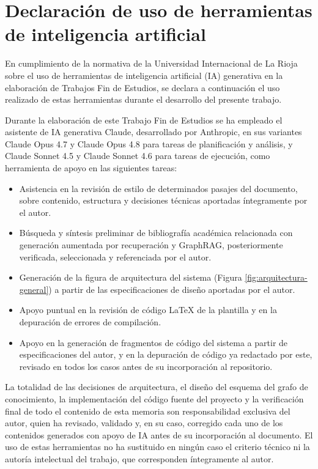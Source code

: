 \documentclass[11pt,a4paper,spanish]{book}
\numberwithin{equation}{chapter}
\numberwithin{figure}{chapter}
\numberwithin{table}{chapter}
\begin{document}
\chapter{Declaración de uso de herramientas de inteligencia artificial}

En cumplimiento de la normativa de la Universidad Internacional de La Rioja sobre el uso de herramientas de inteligencia artificial (IA) generativa en la elaboración de Trabajos Fin de Estudios, se declara a continuación el uso realizado de estas herramientas durante el desarrollo del presente trabajo.

Durante la elaboración de este Trabajo Fin de Estudios se ha empleado el asistente de IA generativa Claude, desarrollado por Anthropic, en sus variantes Claude Opus 4.7 y Claude Opus 4.8 \cite{anthropic2026opus47, anthropic2026opus48} para tareas de planificación y análisis, y Claude Sonnet 4.5 y Claude Sonnet 4.6 \cite{anthropic2026sonnet45, anthropic2026sonnet46} para tareas de ejecución, como herramienta de apoyo en las siguientes tareas:

\begin{itemize}
	\item Asistencia en la revisión de estilo de determinados pasajes del documento, sobre contenido, estructura y decisiones técnicas aportadas íntegramente por el autor.
	\item Búsqueda y síntesis preliminar de bibliografía académica relacionada con generación aumentada por recuperación y GraphRAG, posteriormente verificada, seleccionada y referenciada por el autor.
	\item Generación de la figura de arquitectura del sistema (Figura \ref{fig:arquitectura-general}) a partir de las especificaciones de diseño aportadas por el autor.
	\item Apoyo puntual en la revisión de código LaTeX de la plantilla y en la depuración de errores de compilación.
    \item Apoyo en la generación de fragmentos de código del sistema a partir de especificaciones del autor, y en la depuración de código ya redactado por este, revisado en todos los casos antes de su incorporación al repositorio.
\end{itemize}

La totalidad de las decisiones de arquitectura, el diseño del esquema del grafo de conocimiento, la implementación del código fuente del proyecto y la verificación final de todo el contenido de esta memoria son responsabilidad exclusiva del autor, quien ha revisado, validado y, en su caso, corregido cada uno de los contenidos generados con apoyo de IA antes de su incorporación al documento. El uso de estas herramientas no ha sustituido en ningún caso el criterio técnico ni la autoría intelectual del trabajo, que corresponden íntegramente al autor.
\end{document}
